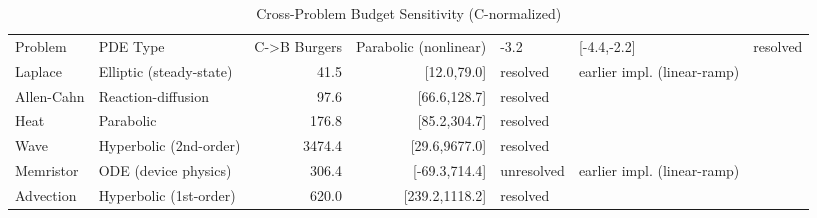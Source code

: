 \begin{table}[htbp]
\centering
\caption{Cross-Problem Budget Sensitivity (C-normalized)}
\label{tab:budget}
\begin{tabular}{llrrll}
\hline
Problem & PDE Type & C->B %
\hline
Burgers & Parabolic (nonlinear) & -3.2 & [-4.4,-2.2] & resolved &  \\
Laplace & Elliptic (steady-state) & 41.5 & [12.0,79.0] & resolved & earlier impl. (linear-ramp) \\
Allen-Cahn & Reaction-diffusion & 97.6 & [66.6,128.7] & resolved &  \\
Heat & Parabolic & 176.8 & [85.2,304.7] & resolved &  \\
Wave & Hyperbolic (2nd-order) & 3474.4 & [29.6,9677.0] & resolved &  \\
Memristor & ODE (device physics) & 306.4 & [-69.3,714.4] & unresolved & earlier impl. (linear-ramp) \\
Advection & Hyperbolic (1st-order) & 620.0 & [239.2,1118.2] & resolved &  \\
\hline
\end{tabular}
\end{table}
